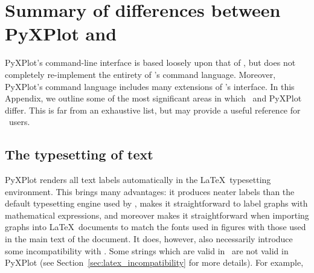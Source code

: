 %
%
%
%
%



\chapter{Summary of differences between PyXPlot and \gnuplot}
\label{ch:gnuplot_diffs}

PyXPlot's command-line interface is based loosely upon that of \gnuplot, but
does not completely re-implement the entirety of \gnuplot's command language.
Moreover, PyXPlot's command language includes many extensions of \gnuplot's
interface. In this Appendix, we outline some of the most significant areas in
which \gnuplot\ and PyXPlot differ. This is far from an exhaustive list, but
may provide a useful reference for \gnuplot\ users.

\section{The typesetting of text}

PyXPlot renders all text labels automatically in the \LaTeX\ typesetting
environment. This brings many advantages: it produces neater labels than the
default typesetting engine used by \gnuplot, makes it straightforward to label
graphs with mathematical expressions, and moreover makes it straightforward
when importing graphs into \LaTeX\ documents to match the fonts used in figures
with those used in the main text of the document.  It does, however, also
necessarily introduce some incompatibility with \gnuplot.  Some strings which
are valid in \gnuplot\ are not valid in PyXPlot (see
Section~\ref{sec:latex_incompatibility} for more details). For
example,


